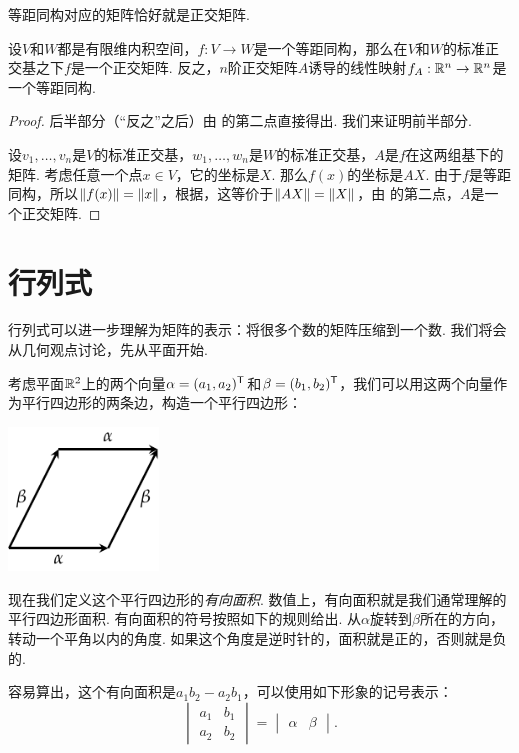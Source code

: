 等距同构对应的矩阵恰好就是正交矩阵. 
\begin{theorem}\label{thm:isometry-matrix}
设$V$和$W$都是有限维内积空间，$f:V\to W$是一个等距同构，那么在$V$和$W$的标准正交基之下$f$是一个正交矩阵. 反之，$n$阶正交矩阵$A$诱导的线性映射$f_A:\mathbb{R}^n\to\mathbb{R}^n$是一个等距同构. 
\end{theorem}
\begin{proof}
    后半部分（“反之”之后）由 的第二点直接得出. 我们来证明前半部分. 
    
    设$v_1,\dots,v_n$是$V$的标准正交基，$w_1,\dots,w_n$是$W$的标准正交基，$A$是$f$在这两组基下的矩阵. 考虑任意一个点$x\in V$，它的坐标是$X$. 那么$f(x)$的坐标是$AX$. 由于$f$是等距同构，所以$\left\|f(x)\right\|=\left\|x\right\|$，根据，这等价于$\left\|AX\right\|=\left\|X\right\|$，由 的第二点，$A$是一个正交矩阵. 
\end{proof}

\section{行列式}\label{sec:determinant}

行列式可以进一步理解为矩阵的表示：将很多个数的矩阵压缩到一个数. 我们将会从几何观点讨论，先从平面开始.  

考虑平面$\mathbb{R}^2$上的两个向量$\alpha=(a_1,a_2)^{\mathsf{T}}$和$\beta=(b_1,b_2)^{\mathsf{T}}$，我们可以用这两个向量作为平行四边形的两条边，构造一个平行四边形：
\begin{center}
\includegraphics[width=0.3\textwidth]{figures/linear-algebra/parallelogram.pdf}
\end{center}

现在我们定义这个平行四边形的\textit{有向面积}. 数值上，有向面积就是我们通常理解的平行四边形面积. 有向面积的符号按照如下的规则给出. 从$\alpha$旋转到$\beta$所在的方向，转动一个平角以内的角度. 如果这个角度是逆时针的，面积就是正的，否则就是负的. 

容易算出，这个有向面积是$a_1b_2-a_2b_1$，可以使用如下形象的记号表示：
\[\begin{vmatrix}
    a_1 & b_1 \\
    a_2 & b_2
\end{vmatrix}=
\begin{vmatrix}
    \alpha & \beta
\end{vmatrix}.\]

